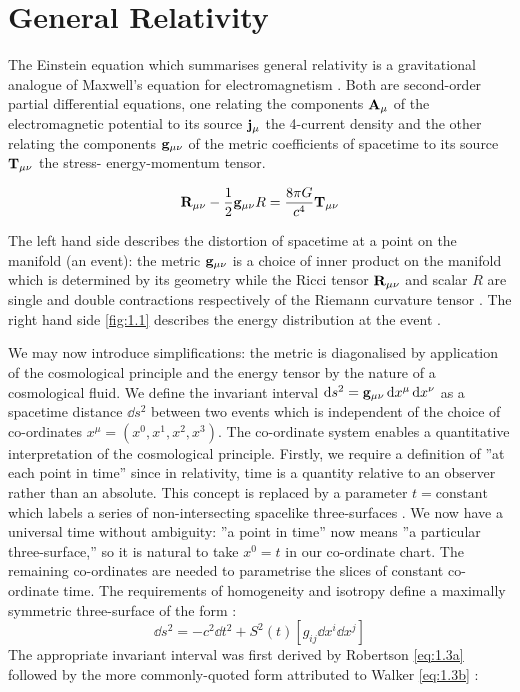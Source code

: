 \section{General Relativity}
\label{sec:1.2}

The Einstein equation which summarises general relativity \cite{Hartle2003} is a gravitational analogue of Maxwell’s equation for electromagnetism \cite{Hobson2006}. Both are second-order partial differential equations, one relating the components $\mathbf{A}_{\mu}$ of the electromagnetic potential to its source $\mathbf{j}_{\mu}$ the 4-current density and the other relating the components $\mathbf{g}_{\mu\nu}$ of the metric coefficients of spacetime to its source $\mathbf{T}_{\mu\nu}$ the stress- energy-momentum tensor.

\begin{equation}
\mathbf{R}_{\mu\nu} - \frac{1}{2} \mathbf{g}_{\mu\nu} R = \frac{8\pi{}G}{c^4} \mathbf{T}_{\mu\nu}
\label{eq:1.1}
\end{equation}

The left hand side describes the distortion of spacetime at a point on the manifold (an event): the metric $\mathbf{g}_{\mu\nu}$ is a choice of inner product on the manifold which is determined by its geometry \cite{doCarmo1992} while the Ricci tensor $\mathbf{R}_{\mu\nu}$ and scalar $R$ are single and double contractions respectively of the Riemann curvature tensor \cite{Hartle2003,Hobson2006}. The right hand side \cref{fig:1.1} describes the energy distribution at the event \cite{Hobson2006}.

We may now introduce simplifications: the metric is diagonalised by application of the cosmological principle and the energy tensor by the nature of a cosmological fluid. We define the invariant interval $\mathop{}\!\mathrm{d}s^2 = \mathbf{g}_{\mu\nu} \mathop{}\!\mathrm{d}x^{\mu} \mathop{}\!\mathrm{d}x^{\nu}$ as a spacetime distance $\dd{s}^2$ between two events which is independent of the choice  of co-ordinates $x^{\mu} = (x^0, x^1 , x^2 , x^3 )$.  The co-ordinate system enables a quantitative interpretation of the cosmological principle. Firstly, we require a definition of ”at each point in time” since in relativity, time is a quantity relative to an observer rather than an absolute. This concept is replaced by a parameter $t = \text{constant}$ which labels a series of non-intersecting spacelike three-surfaces \cite{Hobson2006}. We now have a universal time without ambiguity: ”a point in time” now means ”a particular three-surface,” so it is natural to take $x^0 = t$ in our co-ordinate chart. The remaining co-ordinates are needed to parametrise the slices of constant co-ordinate time. The requirements of homogeneity and isotropy define a maximally symmetric three-surface of the form \cite{Hobson2006}:
\begin{equation}
\dd{s}^{2} = -c^{2} \dd{t}^{2} + S^{2}(t) \left[ g_{ij} \dd{x}^{i} \dd{x}^{j} \right]
\label{eq:1.2}
\end{equation}
The appropriate invariant interval was first derived by Robertson \cref{eq:1.3a} followed by the more commonly-quoted form attributed to Walker \cref{eq:1.3b} \cite{vanOsten2006}:

